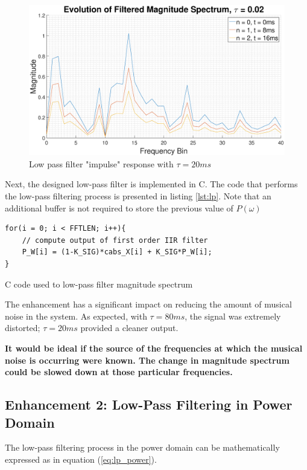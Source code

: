 \documentclass[a4paper,pra,twocolumn,10pt,aps,longbibliography,nobalancelastpage]{revtex4-1}
\begin{document}
\begin{figure}[H]
	\centering
	\includegraphics[width=\columnwidth]{X_filt_tau_002}
  	\caption{Low pass filter "impulse" response with $\tau=20ms$}
	\label{fig:musical_noise_graph_2}
\end{figure}

Next, the designed low-pass filter is implemented in C. The code that performs the low-pass filtering process is presented in listing \ref{lst:lp}. Note that an additional buffer is not required to store the previous value of $P(\omega)$

\begin{listing}[H]
\begin{verbatim}
for(i = 0; i < FFTLEN; i++){
    // compute output of first order IIR filter
    P_W[i] = (1-K_SIG)*cabs_X[i] + K_SIG*P_W[i];
}	
\end{verbatim}
\caption{C code used to low-pass filter magnitude spectrum} 
\label{lst:lp}
\end{listing}

The enhancement has a significant impact on reducing the amount of musical noise in the system. As expected, with $\tau = 80ms$, the signal was extremely distorted; $\tau = 20ms$ provided a cleaner output.

\textbf{It would be ideal if the source of the frequencies at which the musical noise is occurring were known. The change in magnitude spectrum could be slowed down at those particular frequencies.}

\subsection{Enhancement 2: Low-Pass Filtering in Power Domain}
The low-pass filtering process in the power domain can be mathematically expressed as in equation (\ref{eq:lp_power}).
\end{document}
